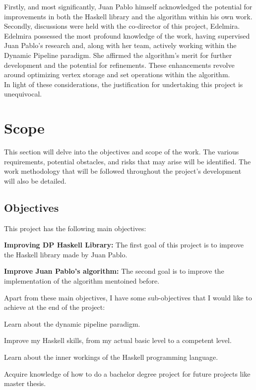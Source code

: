 Firstly, and most significantly, Juan Pablo himself acknowledged the potential for improvements in both the Haskell library and the algorithm within his own work.
Secondly, discussions were held with the co-director of this project, Edelmira.
Edelmira possessed the most profound knowledge of the work, having supervised Juan Pablo's research and, along with her team, actively working within the Dynamic Pipeline paradigm.
She affirmed the algorithm's merit for further development and the potential for refinements.
These enhancements revolve around optimizing vertex storage and set operations within the algorithm. \\

In light of these considerations, the justification for undertaking this project is unequivocal.
\section{Scope}
This section will delve into the objectives and scope of the work.
The various requirements, potential obstacles, and risks that may arise will be identified.
The work methodology that will be followed throughout the project's development will also be detailed.
\subsection{Objectives}
This project has the following main objectives:
\begin{list}{-}{}
    \item \textbf{Improving DP Haskell Library:} The first goal of this project is to improve the Haskell library made by Juan Pablo.
    \item \textbf{Improve Juan Pablo's algorithm:} The second goal is to improve the implementation of the algorithm mentoined before.
\end{list}
Apart from these main objectives, I have some sub-objectives that I would like to achieve at the end of the project:
\begin{list}{-}{}
    \item Learn about the dynamic pipeline paradigm.
    \item Improve my Haskell skills, from my actual basic level to a competent level.
    \item Learn about the inner workings of the Haskell programming language.
    \item Acquire knowledge of how to do a bachelor degree project for future projects like master thesis.
\end{list}
